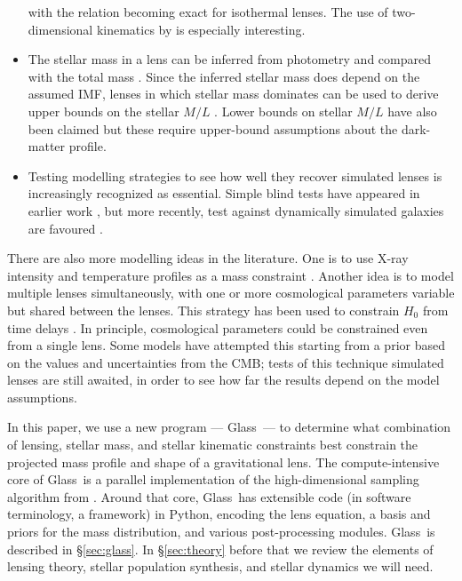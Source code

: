 \documentclass[galley,usenatbib]{mn2e}
\newcommand{\Glass}{{\sc Glass}}
\newcommand{\secref}[1] {\S\ref{#1}}
\begin{document}
\begin{itemize}
  with the relation becoming exact for isothermal lenses.  The use of
  two-dimensional kinematics by \cite{2011MNRAS.415.2215B} is
  especially interesting.
\item The stellar mass in a lens can be inferred from photometry and
  compared with the total mass
  \citep{2005ApJ...623L...5F,2008MNRAS.383..857F,2011ApJ...740...97L}.
  Since the inferred stellar mass does depend on the assumed IMF,
  lenses in which stellar mass dominates can be used to derive upper
  bounds on the stellar $M/L$ \cite{2010MNRAS.409L..30F}. Lower bounds
  on stellar $M/L$ have also been claimed \citep{2013MNRAS.428.3183D}
  but these require upper-bound assumptions about the dark-matter
  profile.
\item Testing modelling strategies to see how well they recover
  simulated lenses is increasingly recognized as essential.  Simple
  blind tests have appeared in earlier work \citep[for example, Figure
    2 in][]{2000AJ....119..439W}, but more recently, test against
  dynamically simulated galaxies are favoured
  \citep{2007ApJ...667..645R,2009MNRAS.393.1114B}.
\end{itemize}
There are also more modelling ideas in the literature.  One is to use
X-ray intensity and temperature profiles as a mass constraint
\citep[such as in][]{2013ApJ...765...25N}.  Another idea is to model
multiple lenses simultaneously, with one or more cosmological
parameters variable but shared between the lenses.  This strategy has
been used to constrain $H_0$ from time delays
\citep{2006ApJ...652L...5S,2008ApJ...679...17C,2010ApJ...712.1378P}.
In principle, cosmological parameters could be constrained even from a
single lens.  Some models have attempted this
\citep{2010Sci...329..924J,2013arXiv1306.4732S} starting from a prior
based on the values and uncertainties from the CMB; tests of this
technique simulated lenses are still awaited, in order to see how far
the results depend on the model assumptions.

In this paper, we use a new program --- \Glass\ --- to determine what
combination of lensing, stellar mass, and stellar kinematic
constraints best constrain the projected mass profile and shape of a
gravitational lens.  The compute-intensive core of \Glass\ is a
parallel implementation of the high-dimensional sampling algorithm
from \cite{2012MNRAS.425.3077L}.  Around that core, \Glass\ has
extensible code (in software terminology, a framework) in Python,
encoding the lens equation, a basis and priors for the mass
distribution, and various post-processing modules.  \Glass\ is
described in \secref{sec:glass}.  In \secref{sec:theory} before that
we review the elements of lensing theory, stellar population
synthesis, and stellar dynamics we will need.
\end{document}
